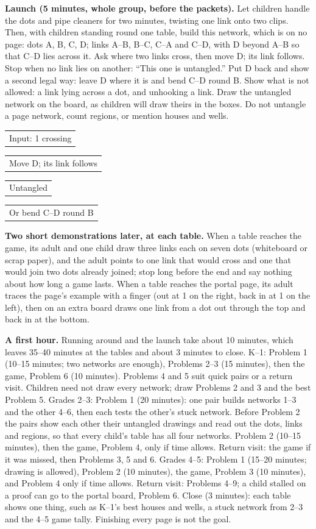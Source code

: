 \documentclass[11pt]{article}
\makeatletter
\newcommand{\fig}[2]{\begin{tabular}[b]{@{}c@{}}\\[2pt]{\scriptsize #2}\end{tabular}}
\makeatother
\begin{document}
\textbf{Launch (5 minutes, whole group, before the packets).} Let children handle the dots and pipe cleaners for two minutes, twisting one link onto two clips. Then, with children standing round one table, build this network, which is on no page: dots A, B, C, D; links A--B, B--C, C--A and C--D, with D beyond A--B so that C--D lies across it. Ask where two links cross, then move D; its link follows. Stop when no link lies on another: ``This one is untangled.'' Put D back and show a second legal way: leave D where it is and bend C--D round B. Show what is not allowed: a link lying across a dot, and unhooking a link. Draw the untangled network on the board, as children will draw theirs in the boxes. Do not untangle a page network, count regions, or mention houses and wells.\par
{\centering\fig{launch_in}{Input: 1 crossing}\hfill\fig{launch_step}{Move D; its link follows}\hfill\fig{launch_out}{Untangled}\hfill\fig{launch_bend}{Or bend C--D round B}\par}
\textbf{Two short demonstrations later, at each table.} When a table reaches the game, its adult and one child draw three links each on seven dots (whiteboard or scrap paper), and the adult points to one link that would cross and one that would join two dots already joined; stop long before the end and say nothing about how long a game lasts. When a table reaches the portal page, its adult traces the page's example with a finger (out at 1 on the right, back in at 1 on the left), then on an extra board draws one link from a dot out through the top and back in at the bottom.

\textbf{A first hour.} Running around and the launch take about 10 minutes, which leaves 35--40 minutes at the tables and about 3 minutes to close.\newline
K--1: Problem 1 (10--15 minutes; two networks are enough), Problems 2--3 (15 minutes), then the game, Problem 6 (10 minutes). Problems 4 and 5 suit quick pairs or a return visit. Children need not draw every network; draw Problems 2 and 3 and the best Problem 5.\newline
Grades 2--3: Problem 1 (20 minutes): one pair builds networks 1--3 and the other 4--6, then each tests the other's stuck network. Before Problem 2 the pairs show each other their untangled drawings and read out the dots, links and regions, so that every child's table has all four networks. Problem 2 (10--15 minutes), then the game, Problem 4, only if time allows. Return visit: the game if it was missed, then Problems 3, 5 and 6.\newline
Grades 4--5: Problem 1 (15--20 minutes; drawing is allowed), Problem 2 (10 minutes), the game, Problem 3 (10 minutes), and Problem 4 only if time allows. Return visit: Problems 4--9; a child stalled on a proof can go to the portal board, Problem 6.\newline
Close (3 minutes): each table shows one thing, such as K--1's best houses and wells, a stuck network from 2--3 and the 4--5 game tally. Finishing every page is not the goal.


\end{document}
